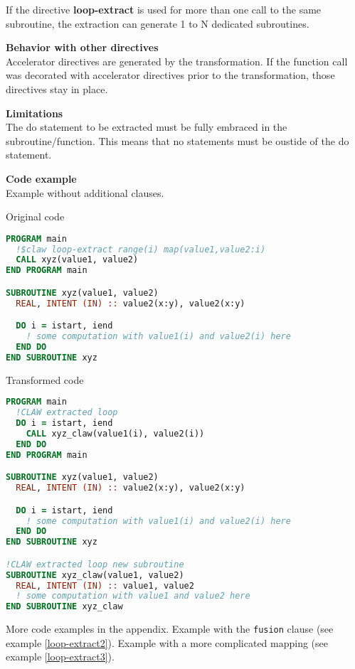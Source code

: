 If the directive \textbf{loop-extract} is used for more than one call to the
same subroutine, the extraction can generate 1 to N dedicated subroutines.

\textbf{Behavior with other directives}\\
Accelerator directives are generated by the transformation. If the function call
was decorated with accelerator directives prior to the transformation, those
directives stay in place.

\textbf{Limitations}\\
The do statement to be extracted must be fully embraced in the
subroutine/function. This means that no statements must be oustide of the do
statement.

\textbf{Code example}\\
\label{loop-extract1}
Example without additional clauses.

Original code
\begin{lstlisting}[language=Fortran]
PROGRAM main
  !$claw loop-extract range(i) map(value1,value2:i)
  CALL xyz(value1, value2)
END PROGRAM main

SUBROUTINE xyz(value1, value2)
  REAL, INTENT (IN) :: value2(x:y), value2(x:y)

  DO i = istart, iend
    ! some computation with value1(i) and value2(i) here
  END DO
END SUBROUTINE xyz
\end{lstlisting}


Transformed code
\begin{lstlisting}[language=Fortran]
PROGRAM main
  !CLAW extracted loop
  DO i = istart, iend
    CALL xyz_claw(value1(i), value2(i))
  END DO
END PROGRAM main

SUBROUTINE xyz(value1, value2)
  REAL, INTENT (IN) :: value2(x:y), value2(x:y)

  DO i = istart, iend
    ! some computation with value1(i) and value2(i) here
  END DO
END SUBROUTINE xyz

!CLAW extracted loop new subroutine
SUBROUTINE xyz_claw(value1, value2)
  REAL, INTENT (IN) :: value1, value2
  ! some computation with value1 and value2 here
END SUBROUTINE xyz_claw
\end{lstlisting}

More code examples in the appendix. Example with the \lstinline!fusion! clause
(see example \ref{loop-extract2}). Example with a more complicated mapping
(see example \ref{loop-extract3}).

%
%

